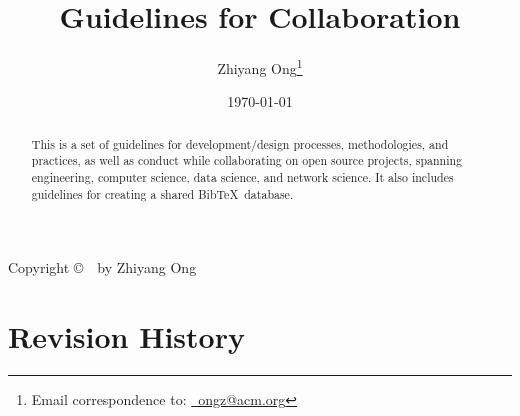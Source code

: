 \documentclass[letter,12pt]{article}
\begin{document}
\title{Guidelines for Collaboration}
\date{\today}
\author{Zhiyang Ong\thanks{Email correspondence to: \href{mailto:ongz@acm.org}{\Email\ ongz@acm.org}}}
\maketitle



%


\begin{center} 
Copyright \copyright\ \the\year\ by Zhiyang Ong
\end{center}
\doclicenseThis




\begin{abstract} 
This is a set of guidelines for development/design processes, methodologies, and practices, as well as conduct while collaborating on open source projects, spanning engineering, computer science, data science, and network science. It also includes guidelines for creating a shared {\sc Bib}\TeX\ database.
\end{abstract}


\tableofcontents
\setcounter{secnumdepth}{4}



\section*{Revision History}
\label{sec:RevisionHistory}
\end{document}
